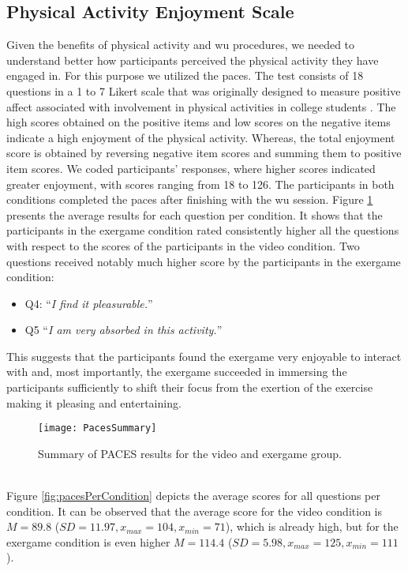 \subsection{Physical Activity Enjoyment Scale}
Given the benefits of physical activity and \acrshort{wu} procedures, we needed to understand better how participants perceived the physical activity they have engaged in. For this purpose we utilized the \acrfull{paces}. The test consists of 18 questions in a 1 to 7 Likert scale that was originally designed to measure positive affect associated with involvement in physical activities in college students \cite{kendzierski1991physical}. The high scores obtained on the positive items and low scores on the negative items indicate a high enjoyment of the physical activity. Whereas, the total enjoyment score is obtained by reversing negative item scores and summing them to positive item scores. We coded participants' responses, where higher scores indicated greater enjoyment, with scores ranging from 18 to 126. The participants in both conditions completed the \gls{paces} after finishing with the \acrshort{wu} session. Figure \ref{fig:pacees} presents the average results for each question per condition. It shows that the participants in the exergame condition rated consistently higher all the questions with respect to the scores of the participants in the video condition. Two questions received notably much higher score by the participants in the exergame condition: \begin{itemize}
\item Q4: ``\textit{I find it pleasurable.}''
\item Q5 ``\textit{I am very absorbed in this activity.}''
\end{itemize} \pagebreak
This suggests that the participants found the exergame very enjoyable to interact with  and, most importantly, the exergame succeeded in immersing the participants sufficiently to shift their focus from the exertion of the exercise making it pleasing and entertaining.
\begin{figure}[h]
    \centering
    \texttt{[image: PacesSummary]}
    \caption{Summary of PACES results for the video and exergame group.}
    \label{fig:pacees}
\end{figure}\\
Figure \ref{fig:pacesPerCondition} depicts the average scores for all questions per condition. It can be observed that the average score for the video condition is \begin{math}M = 89.8 \end{math} (\begin{math} SD = 11.97, x_{max}= 104, x_{min}= 71\end{math}), which is already high, but for the exergame condition is even higher  \begin{math}M = 114.4 \end{math} (\begin{math} SD = 5.98, x_{max}= 125, x_{min}= 111\end{math}).\\
